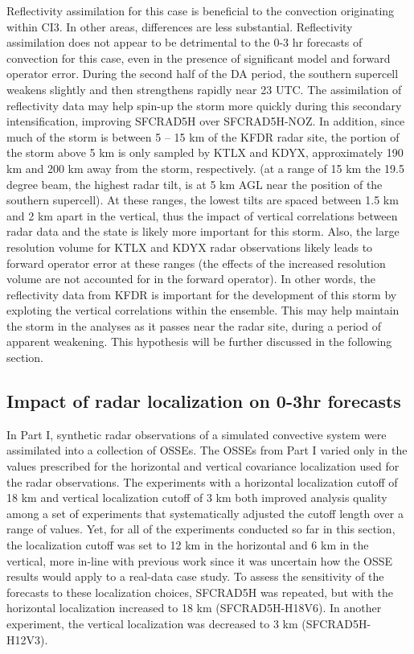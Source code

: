 Reflectivity assimilation for this case is beneficial to the convection originating within CI3. In other areas, differences are less substantial. Reflectivity assimilation does not appear to be detrimental to the 0-3 hr forecasts of convection for this case, even in the presence of significant model and forward operator error. During the second half of the DA period, the southern supercell weakens slightly and then strengthens rapidly near 23 UTC. The assimilation of reflectivity data may help spin-up the storm more quickly during this secondary intensification, improving SFCRAD5H over SFCRAD5H-NOZ. In addition, since much of the storm is between 5 -- 15 km of the KFDR radar site, the portion of the storm above 5 km is only sampled by KTLX and KDYX, approximately 190 km and 200 km away from the storm, respectively. (at a range of 15 km the 19.5 degree beam, the highest radar tilt, is at 5 km AGL near the position of the southern supercell). At these ranges, the lowest tilts are spaced between 1.5 km and 2 km apart in the vertical, thus the impact of vertical correlations between radar data and the state is likely more important for this storm. Also, the large resolution volume for KTLX and KDYX radar observations likely leads to forward operator error at these ranges (the effects of the increased resolution volume are not accounted for in the forward operator). In other words, the reflectivity data from KFDR is important for the development of this storm by exploting the vertical correlations within the ensemble. This may help maintain the storm in the analyses as it passes near the radar site, during a period of apparent weakening. This hypothesis will be further discussed in the following section.

\subsection{Impact of radar localization on 0-3hr forecasts}
In Part I, synthetic radar observations of a simulated convective system were assimilated into a collection of OSSEs. The OSSEs from Part I varied only in the values prescribed for the horizontal and vertical covariance localization used for the radar observations. The experiments with a horizontal localization cutoff of 18 km and vertical localization cutoff of 3 km both improved analysis quality among a set of experiments that systematically adjusted the cutoff length over a range of values. Yet, for all of the experiments conducted so far in this section, the localization cutoff was set to 12 km in the horizontal and 6 km in the vertical, more in-line with previous work since it was uncertain how the OSSE results would apply to a real-data case study. To assess the sensitivity of the forecasts to these localization choices, SFCRAD5H was repeated, but with the horizontal localization increased to 18 km (SFCRAD5H-H18V6). In another experiment, the vertical localization was decreased to 3 km (SFCRAD5H-H12V3).

